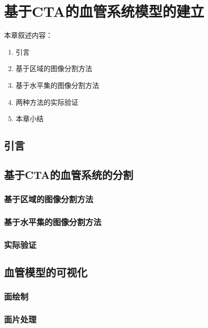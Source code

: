 \chapter{基于CTA的血管系统模型的建立}
\label{chap3} \fontsize{12pt}{12pt}\selectfont

本章叙述内容：
\begin{enumerate}
  \item 引言
  \item 基于区域的图像分割方法
  \item 基于水平集的图像分割方法
  \item 两种方法的实际验证
  \item 本章小结
\end{enumerate}

\section{引言}

\section{基于CTA的血管系统的分割}

\subsection{基于区域的图像分割方法}

\subsection{基于水平集的图像分割方法}

\subsection{实际验证}

\section{血管模型的可视化}

\subsection{面绘制}

\cite{Lorensen1987MC}

\subsection{面片处理}

